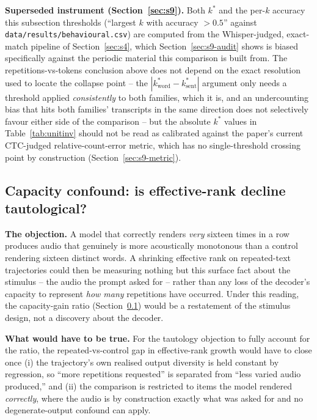 \documentclass[11pt]{article}
\begin{document}
\noindent\textbf{Superseded instrument (Section~\ref{sec:s9}).} Both
$k^\ast$ and the per-$k$ accuracy this subsection thresholds (``largest $k$
with accuracy $>0.5$'' against \texttt{data/results/behavioural.csv}) are
computed from the Whisper-judged, exact-match pipeline of
Section~\ref{sec:s4}, which Section~\ref{sec:s9-audit} shows is biased
specifically against the periodic material this comparison is built from.
The repetitions-vs-tokens conclusion above does not depend on the exact
resolution used to locate the collapse point -- the
$|k^\ast_{\mathrm{word}}-k^\ast_{\mathrm{sent}}|$ argument only needs a
threshold applied \emph{consistently} to both families, which it is, and an
undercounting bias that hits both families' transcripts in the same
direction does not selectively favour either side of the comparison -- but
the absolute $k^\ast$ values in Table~\ref{tab:unitinv} should not be read
as calibrated against the paper's current CTC-judged relative-count-error
metric, which has no single-threshold crossing point by construction
(Section~\ref{sec:s9-metric}).

\subsection{Capacity confound: is effective-rank decline tautological?}
\label{sec:s8-capacity}

\textbf{The objection.} A model that correctly renders \emph{very} sixteen
times in a row produces audio that genuinely is more acoustically monotonous
than a control rendering sixteen distinct words. A shrinking effective rank on
repeated-text trajectories could then be measuring nothing but this surface
fact about the stimulus -- the audio the prompt asked for -- rather than any
loss of the decoder's capacity to represent \emph{how many} repetitions have
occurred. Under this reading, the capacity-gain ratio
(Section~\ref{sec:s8-capacity}) would be a restatement of the stimulus design,
not a discovery about the decoder.

\textbf{What would have to be true.} For the tautology objection to fully
account for the ratio, the repeated-vs-control gap in effective-rank growth
would have to close once (i) the trajectory's own realised output diversity is
held constant by regression, so ``more repetitions requested'' is separated
from ``less varied audio produced,'' and (ii) the comparison is restricted to
items the model rendered \emph{correctly}, where the audio is by construction
exactly what was asked for and no degenerate-output confound can apply.
\end{document}
